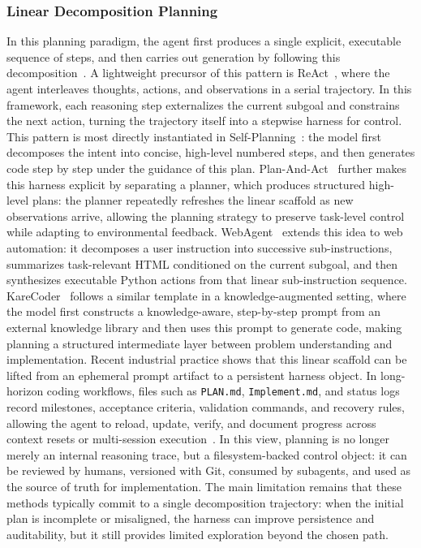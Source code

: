 \subsubsection{Linear Decomposition Planning} 
In this planning paradigm, the agent first produces a single explicit, executable sequence of steps, and then carries out generation by following this decomposition~\cite{huang2024knowledge,jiang2024selfplanning,gur2023webagent,linearplan1,zhang2025linearplan2}. A lightweight precursor of this pattern is ReAct~\cite{yao2023reactsynergizingreasoningacting}, where the agent interleaves thoughts, actions, and observations in a serial trajectory. In this framework, each reasoning step externalizes the current subgoal and constrains the next action, turning the trajectory itself into a stepwise harness for control. 
This pattern is most directly instantiated in Self-Planning~\cite{jiang2024selfplanning}: the model first decomposes the intent into concise, high-level numbered steps, and then generates code step by step under the guidance of this plan. Plan-And-Act~\cite{erdogan2025plan} further makes this harness explicit by separating a planner, which produces structured high-level plans: the planner repeatedly refreshes the linear scaffold as new observations arrive, allowing the planning strategy to preserve task-level control while adapting to environmental feedback. WebAgent~\cite{gur2023webagent} extends this idea to web automation: it decomposes a user instruction into successive sub-instructions, summarizes task-relevant HTML conditioned on the current subgoal, and then synthesizes executable Python actions from that linear sub-instruction sequence. KareCoder~\cite{huang2024knowledge} follows a similar template in a knowledge-augmented setting, where the model first constructs a knowledge-aware, step-by-step prompt from an external knowledge library and then uses this prompt to generate code, making planning a structured intermediate layer between problem understanding and implementation. 
Recent industrial practice shows that this linear scaffold can be lifted from an ephemeral prompt artifact to a persistent harness object. In long-horizon coding workflows, files such as \texttt{PLAN.md}, \texttt{Implement.md}, and status logs record milestones, acceptance criteria, validation commands, and recovery rules, allowing the agent to reload, update, verify, and document progress across context resets or multi-session execution~\cite{openai2025execplans,openai2026codexlonghorizon}. In this view, planning is no longer merely an internal reasoning trace, but a filesystem-backed control object: it can be reviewed by humans, versioned with Git, consumed by subagents, and used as the source of truth for implementation. The main limitation remains that these methods typically commit to a single decomposition trajectory: when the initial plan is incomplete or misaligned, the harness can improve persistence and auditability, but it still provides limited exploration beyond the chosen path.


